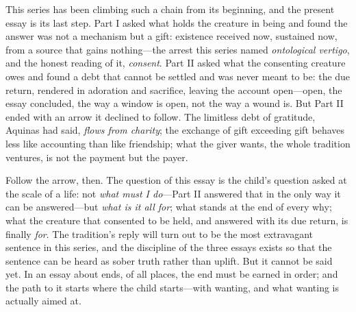 This series has been climbing such a chain from its beginning, and the present essay is its last step. Part I asked what holds the creature in being and found the answer was not a mechanism but a gift: existence received now, sustained now, from a source that gains nothing---the arrest this series named \emph{ontological vertigo}, and the honest reading of it, \emph{consent}. Part II asked what the consenting creature owes and found a debt that cannot be settled and was never meant to be: the due return, rendered in adoration and sacrifice, leaving the account open---open, the essay concluded, the way a window is open, not the way a wound is. But Part II ended with an arrow it declined to follow. The limitless debt of gratitude, Aquinas had said, \emph{flows from charity}; the exchange of gift exceeding gift behaves less like accounting than like friendship; what the giver wants, the whole tradition ventures, is not the payment but the payer.

Follow the arrow, then. The question of this essay is the child's question asked at the scale of a life: not \emph{what must I do}---Part II answered that in the only way it can be answered---but \emph{what is it all for}; what stands at the end of every why; what the creature that consented to be held, and answered with its due return, is finally \emph{for}. The tradition's reply will turn out to be the most extravagant sentence in this series, and the discipline of the three essays exists so that the sentence can be heard as sober truth rather than uplift. But it cannot be said yet. In an essay about ends, of all places, the end must be earned in order; and the path to it starts where the child starts---with wanting, and what wanting is actually aimed at.
